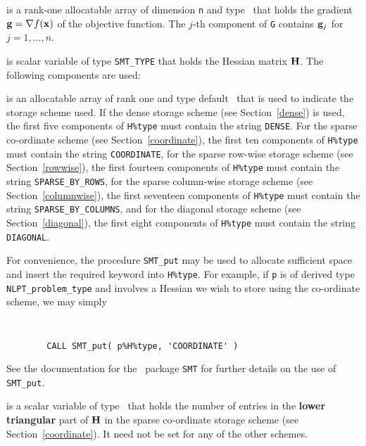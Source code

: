 \documentclass{galahad}
\newcommand{\Grad}{\nabla}
\begin{document}
\begin{description}
\begin{description}
 is a rank-one allocatable array of dimension {\tt n} and type 
\realdp\ that holds the gradient $\bmg = \Grad f(\bmx)$ 
of the objective function.
The $j$-th component of 
{\tt G} contains ${\mathbf{g}}_{j}$ for $j = 1, \ldots, n$.

\end{description}

 is scalar variable of type {\tt SMT\_TYPE} 
that holds the Hessian matrix ${\mathbf{H}}$. The following components
are used:

\begin{description}

 is an allocatable array of rank one and type default 
\character\ that
is used to indicate the storage scheme used. If the dense storage scheme 
(see Section~\ref{dense}) is used, 
the first five components of {\tt H\%type} must contain the
string {\tt DENSE}.
For the sparse co-ordinate scheme (see Section~\ref{coordinate}), 
the first ten components of {\tt H\%type} must contain the
string {\tt COORDINATE},  
for the sparse row-wise storage scheme (see Section~\ref{rowwise}),
the first fourteen components of {\tt H\%type} must contain the
string {\tt SPARSE\_BY\_ROWS},
for the sparse column-wise storage scheme (see Section~\ref{columnwise}),
the first seventeen components of {\tt H\%type} must contain the
string {\tt SPARSE\_BY\_COLUMNS},
and for the diagonal storage scheme (see Section~\ref{diagonal}),
the first eight components of {\tt H\%type} must contain the
string {\tt DIAGONAL}.

For convenience, the procedure {\tt SMT\_put} 
may be used to allocate sufficient space and insert the required keyword
into {\tt H\%type}.
For example, if {\tt p} is of derived type {\tt NLPT\_problem\_type}
and involves a Hessian we wish to store using the co-ordinate scheme,
we may simply
{\tt 
\begin{verbatim}
        CALL SMT_put( p%H%type, 'COORDINATE' )
\end{verbatim}
}
\noindent
See the documentation for the \galahad\ package {\tt SMT} 
for further details on the use of {\tt SMT\_put}.

 is a scalar variable of type \integer\ that 
holds the number of entries in the {\bf lower triangular} part of ${\mathbf{H}}$
in the sparse co-ordinate storage scheme (see Section~\ref{coordinate}). 
It need not be set for any of the other schemes.


\end{description}
\end{description}
\end{document}
